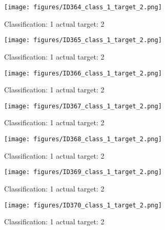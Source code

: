 \begin{figure}[h!]
\begin{center}
\texttt{[image: figures/ID364\_class\_1\_target\_2.png]}
\end{center}
\caption{ Classification: 1 actual target: 2}
\label{fig:ID364_class_1_target_2}
\end{figure}
\begin{figure}[h!]
\begin{center}
\texttt{[image: figures/ID365\_class\_1\_target\_2.png]}
\end{center}
\caption{ Classification: 1 actual target: 2}
\label{fig:ID365_class_1_target_2}
\end{figure}
\begin{figure}[h!]
\begin{center}
\texttt{[image: figures/ID366\_class\_1\_target\_2.png]}
\end{center}
\caption{ Classification: 1 actual target: 2}
\label{fig:ID366_class_1_target_2}
\end{figure}
\begin{figure}[h!]
\begin{center}
\texttt{[image: figures/ID367\_class\_1\_target\_2.png]}
\end{center}
\caption{ Classification: 1 actual target: 2}
\label{fig:ID367_class_1_target_2}
\end{figure}
\begin{figure}[h!]
\begin{center}
\texttt{[image: figures/ID368\_class\_1\_target\_2.png]}
\end{center}
\caption{ Classification: 1 actual target: 2}
\label{fig:ID368_class_1_target_2}
\end{figure}
\begin{figure}[h!]
\begin{center}
\texttt{[image: figures/ID369\_class\_1\_target\_2.png]}
\end{center}
\caption{ Classification: 1 actual target: 2}
\label{fig:ID369_class_1_target_2}
\end{figure}
\begin{figure}[h!]
\begin{center}
\texttt{[image: figures/ID370\_class\_1\_target\_2.png]}
\end{center}
\caption{ Classification: 1 actual target: 2}
\label{fig:ID370_class_1_target_2}
\end{figure}
